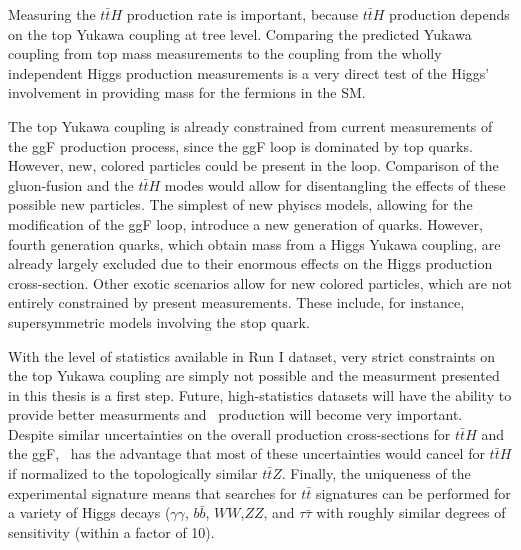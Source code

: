 Measuring the $t\bar{t}H$ production rate is important, because
$t\bar{t}H$ production depends on the top Yukawa coupling at tree level. Comparing
the predicted Yukawa coupling from top mass measurements to the coupling from
the wholly independent Higgs production measurements is a very direct 
test of the Higgs' involvement in providing mass for the fermions in the SM.

The top Yukawa coupling is already constrained from current measurements of the ggF production
process, since the ggF loop is dominated by top quarks. However, new, colored particles could be
present in the loop. Comparison of the gluon-fusion and the $t\bar{t}H$
modes would allow for disentangling the effects of these possible new particles\cite{Dawson:2013bba}. 
The simplest of new phyiscs models, allowing for the modification
of the ggF loop, introduce a new generation of quarks. However, fourth
generation quarks, which obtain mass from a Higgs Yukawa coupling, are already
largely excluded due to their enormous effects on the Higgs production
cross-section\cite{Eberhardt:2012gv}. Other exotic scenarios allow for new colored particles, 
which are not entirely constrained by present measurements\cite{Carena:2013iba,ArkaniHamed:2012kq,Carmi:2012yp}.
These include, for instance, supersymmetric models involving the stop quark.  

With the level of statistics available in Run I dataset, very strict constraints on the top 
Yukawa coupling are simply not possible and the measurment presented in this 
thesis is a first step. Future, high-statistics datasets will have the ability to provide 
better measurments and \tth\ production will become very important.
Despite similar uncertainties on the overall production cross-sections for $t\bar{t}H$ and the ggF,
\tth\ has the advantage that most of these uncertainties would cancel for $t\bar{t}H$ if normalized to the topologically similar $t\bar{t}Z$.  Finally, the uniqueness of the experimental signature means that
searches for $t\bar{t}$ signatures can be performed for a variety of Higgs decays ($\gamma\gamma$, $b\bar{b}$,
$WW$,$ZZ$, and $\tau\bar{\tau}$ with roughly similar degrees of sensitivity (within a factor of 10)\cite{Dawson:2013bba}. 


